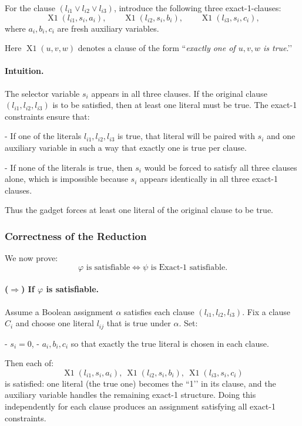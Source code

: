 \documentclass[9pt]{extarticle}
\begin{document}
For the clause $(l_{i1} \lor l_{i2} \lor l_{i3})$, introduce the following
three exact-1-clauses:
\[
\operatorname{X1}(l_{i1}, s_i, a_i), \qquad
\operatorname{X1}(l_{i2}, s_i, b_i), \qquad
\operatorname{X1}(l_{i3}, s_i, c_i),
\]
where $a_i,b_i,c_i$ are fresh auxiliary variables.

Here $\operatorname{X1}(u,v,w)$ denotes a clause of the form
``\emph{exactly one of $u,v,w$ is true}.’’

\paragraph{Intuition.}
The selector variable $s_i$ appears in all three clauses.  If the original
clause $(l_{i1},l_{i2},l_{i3})$ is to be satisfied, then at least one
literal must be true.  The exact-1 constraints ensure that:

- If one of the literals $l_{i1},l_{i2},l_{i3}$ is true, that literal will be
paired with $s_i$ and one auxiliary variable in such a way that exactly one is
true per clause.

- If none of the literals is true, then $s_i$ would be forced to satisfy all
three clauses alone, which is impossible because $s_i$ appears identically in
all three exact-1 clauses.

Thus the gadget forces at least one literal of the original clause to be true.

\subsubsection*{Correctness of the Reduction}

We now prove:
\[
\varphi \text{ is satisfiable} \iff \psi \text{ is Exact-1 satisfiable}.
\]

\paragraph{($\Rightarrow$) If $\varphi$ is satisfiable.}

Assume a Boolean assignment $\alpha$ satisfies each clause
$(l_{i1},l_{i2},l_{i3})$.  
Fix a clause $C_i$ and choose one literal $l_{ij}$ that is true under $\alpha$.
Set:

- $s_i = 0$,
- $a_i,b_i,c_i$ so that exactly the true literal is chosen in each clause.

Then each of:
\[
\operatorname{X1}(l_{i1}, s_i, a_i),\ 
\operatorname{X1}(l_{i2}, s_i, b_i),\ 
\operatorname{X1}(l_{i3}, s_i, c_i)
\]
is satisfied: one literal (the true one) becomes the ``1’’ in its clause, and
the auxiliary variable handles the remaining exact-1 structure.  
Doing this independently for each clause produces an assignment satisfying all
exact-1 constraints.
\end{document}
